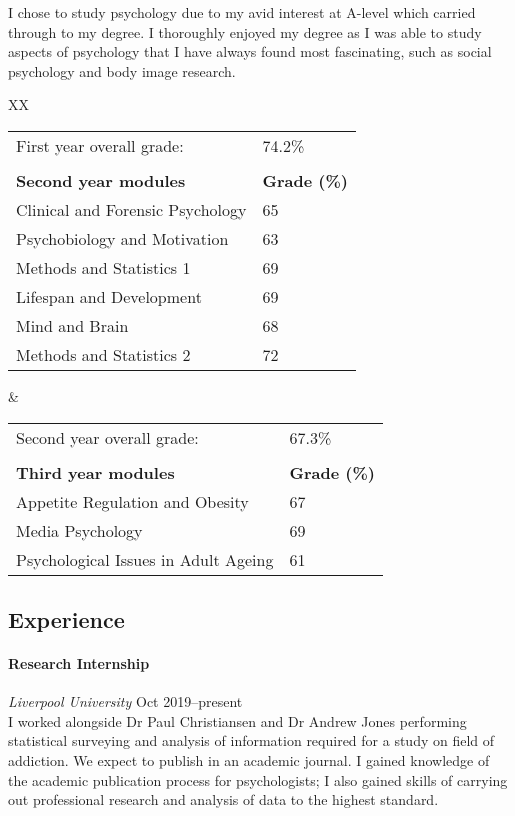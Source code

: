 \documentclass[11pt,a4paper]{article}
\newcommand{\centry}[3]{\paragraph{#1} \textit{#2}%
\hfill#3\\[2pt]}
\begin{document}
I chose to study psychology due to my avid interest at A-level which carried
through to my degree. I thoroughly enjoyed my degree as I was able to study
aspects of psychology that I have always found most fascinating, such as social
psychology and body image research.

\begin{tabularx}{\linewidth}{XX}
  \begin{flushleft}
    \begin{tabular}{ll}
      First year overall grade: & 74.2\% \\
      \\
      \textbf{Second year modules} & \textbf{Grade (\%)}\\
      Clinical and Forensic Psychology & 65\\
      Psychobiology and Motivation & 63\\
      Methods and Statistics 1& 69\\
      Lifespan and Development &69\\
      Mind and Brain& 68\\
      Methods and Statistics 2&72\\
    \end{tabular}
  \end{flushleft}
  &
  \begin{flushright}
    \begin{tabular}{ll}
      Second year overall grade: & 67.3\% \\
      \\
      \textbf{Third year modules} & \textbf{Grade (\%)}\\
      Appetite Regulation and Obesity &67\\
      Media Psychology & 69\\
      Psychological Issues in Adult Ageing& 61\\
    \end{tabular}
  \end{flushright}    
\end{tabularx}

\subsection*{Experience}

\centry{Research Internship}{Liverpool University}{Oct 2019--present}

I worked alongside Dr Paul Christiansen and Dr Andrew Jones performing
statistical surveying and analysis of information required for a study on field
of addiction. We expect to publish in an academic journal. I gained knowledge
of the academic publication process for psychologists; I also gained skills of
carrying out professional research and analysis of data to the highest
standard.
\end{document}

